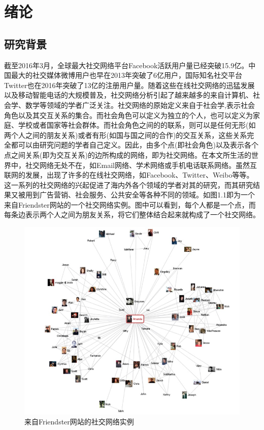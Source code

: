 \chapter{绪论}

\section{研究背景}

截至2016年3月，全球最大社交网络平台Facebook活跃用户量已经突破15.9亿。中国最大的社交媒体微博用户也早在2013年突破了6亿用户，国际知名社交平台Twitter也在2016年突破了13亿的注册用户量。随着这些在线社交网络的迅猛发展以及移动智能电话的大规模普及，社交网络分析引起了越来越多的来自计算机、社会学、数学等领域的学者广泛关注。社交网络的原始定义来自于社会学,表示社会角色以及其交互关系的集合。而社会角色可以定义为独立的个人，也可以定义为家庭、学校或者国家等社会群体。而社会角色之间的的联系，则可以是任何无形(如两个人之间的朋友关系)或者有形(如国与国之间的合作)的交互关系，这些关系完全都可以由研究问题的学者自己定义。因此，由多个点(即社会角色)以及表示各个点之间关系(即为交互关系)的边所构成的网络，即为社交网络。在本文所生活的世界中，社交网络无处不在，如Email网络、学术网络或手机电话联系网络。虽然互联网的发展，出现了许多的在线社交网络，如Facebook、Twitter、Weibo等等。这一系列的社交网络的兴起促进了海内外各个领域的学者对其的研究，而其研究结果又被用到广告营销、社会服务、公共安全等各种不同的领域。如图1.1即为一个来自Friendster网站的一个社交网络实例。图中可以看到，每个人都是一个点，而每条边表示两个人之间为朋友关系，将它们整体结合起来就构成了一个社交网络。

\begin{figure}[!ht]
    \centering
    \includegraphics[]{figure/friends.png}
    \caption{来自Friendster网站的社交网络实例}
    \label{fig-friends}
\end{figure}



